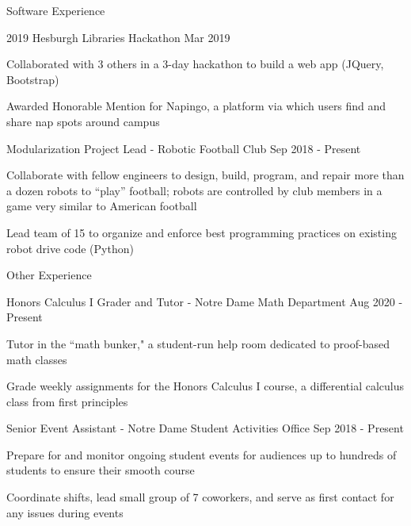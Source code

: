 \documentclass[10pt]{resume} %
\begin{document}
\begin{rSection}{ Software Experience }
\begin{rSubsection}{ 2019 Hesburgh Libraries Hackathon }{ Mar 2019 }{}{}
\item Collaborated with 3 others in a 3-day hackathon to build a web app (JQuery, Bootstrap)
\item Awarded Honorable Mention for Napingo, a platform via which users find and share nap spots around campus
\end{rSubsection}

\begin{rSubsection}{ Modularization Project Lead - Robotic Football Club }{ Sep 2018 - Present }{}{}
\item Collaborate with fellow engineers to design, build, program, and repair more than a dozen robots to ``play'' football; robots are controlled by club members in a game very similar to American football
\item Lead team of 15 to organize and enforce best programming practices on existing robot drive code (Python)
\end{rSubsection}

\end{rSection}


\begin{rSection}{Other Experience}

\begin{rSubsection}{ Honors Calculus I Grader and Tutor - Notre Dame Math Department }{ Aug 2020 - Present }{}{}
\item Tutor in the ``math bunker," a student-run help room dedicated to proof-based math classes
\item Grade weekly assignments for the Honors Calculus I course, a differential calculus class from first principles
\end{rSubsection}


\begin{rSubsection}{ Senior Event Assistant - Notre Dame Student Activities Office }{ Sep 2018 - Present }{}{}
\item Prepare for and monitor ongoing student events for audiences up to hundreds of students to ensure their smooth course
\item Coordinate shifts, lead small group of 7 coworkers, and serve as first contact for any issues during events
\end{rSubsection}

\end{rSection}
\end{document}
